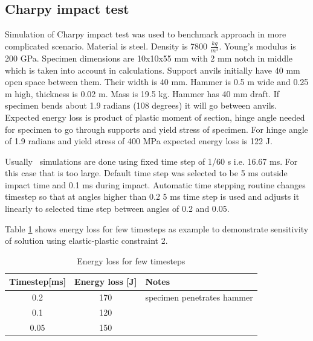 \subsection{Charpy impact test}
Simulation of Charpy impact test was used to benchmark approach in more complicated scenario. 
Material is steel. Density is 7800 $\frac{kg}{m^{3}}$. Young’s modulus is 200 GPa.
Specimen dimensions are 10x10x55 mm with 2 mm notch in middle which is taken into account in calculations.
Support anvils initially have 40 mm open space between them. Their width is 40 mm. 
Hammer is 0.5 m wide and 0.25 m high, thickness is 0.02 m. Mass is 19.5 kg.
Hammer has 40 mm draft.
If specimen bends about 1.9 radians (108 degrees) it will go between anvils.
Expected energy loss is product of plastic moment of section, hinge angle needed for specimen to go through supports and 
yield stress of specimen. For hinge angle of 1.9 radians and yield stress of 400 MPa expected energy 
loss is 122 J.

Usually \bullet\ simulations are done using fixed time step of 1/60 s i.e. 16.67 ms. 
For this case that is too large. 
Default time step was selected to be 5 ms outside impact time and 0.1 ms during impact. 
Automatic time stepping routine changes timestep so that at angles higher than 0.2 5 ms time step is
used and adjusts it linearly to selected time step between angles of 0.2 and 0.05.

Table \ref{tab:ep2ts} shows energy loss for few timesteps as example to demonstrate sensitivity of solution
using  elastic-plastic constraint 2.

\begin {table}[htb!]
\begin{center}
\begin{tabular}{| c| c|l|}
\hline
{\bf Timestep[ms]} & {\bf Energy loss [J]} & {\bf Notes} \\ \hline
 0.2 &  170 & specimen penetrates hammer  \\ \hline
 0.1 &  120 & \\ \hline
 0.05 &  150 & \\ \hline
\end {tabular}
\end{center}
\caption {Energy loss for few timesteps} \label{tab:ep2ts} 
\end {table}

